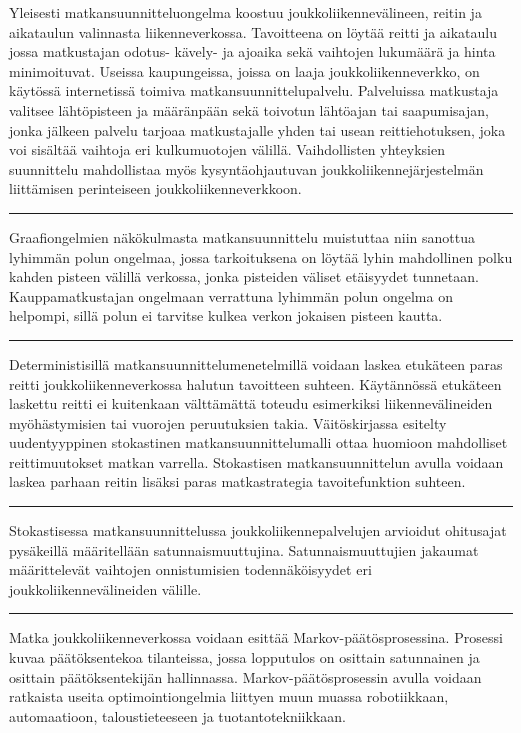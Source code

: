 \documentclass[a4paper,12pt]{article}
\newcommand*\sepline{%
  \begin{center}
    \rule[1ex]{.5\textwidth}{.5pt}
  \end{center}}
\begin{document}
Yleisesti matkansuunnitteluongelma koostuu joukkoliikennevälineen, reitin ja aikataulun valinnasta liikenneverkossa. 
Tavoitteena on löytää reitti ja aikataulu jossa matkustajan
odotus- kävely- ja ajoaika sekä vaihtojen lukumäärä ja hinta minimoituvat. Useissa kaupungeissa, joissa 
on laaja joukkoliikenneverkko, on käytössä internetissä toimiva matkansuunnittelupalvelu. Palveluissa 
matkustaja valitsee lähtöpisteen ja määränpään sekä toivotun lähtöajan tai saapumisajan, jonka jälkeen
palvelu tarjoaa matkustajalle yhden tai usean reittiehotuksen, joka voi sisältää vaihtoja eri kulkumuotojen välillä.
Vaihdollisten yhteyksien suunnittelu mahdollistaa myös kysyntäohjautuvan joukkoliikennejärjestelmän liittämisen
perinteiseen joukkoliikenneverkkoon.

\sepline

Graafiongelmien näkökulmasta matkansuunnittelu muistuttaa niin sanottua lyhimmän polun ongelmaa, jossa
tarkoituksena on löytää lyhin mahdollinen polku kahden pisteen välillä verkossa, jonka pisteiden väliset etäisyydet tunnetaan.
Kauppamatkustajan ongelmaan verrattuna lyhimmän polun ongelma on helpompi, sillä polun ei tarvitse kulkea verkon jokaisen 
pisteen kautta.

\sepline

Deterministisillä matkansuunnittelumenetelmillä voidaan laskea etukäteen paras reitti joukkoliikenneverkossa halutun
tavoitteen suhteen. Käytännössä etukäteen 
laskettu reitti ei kuitenkaan välttämättä toteudu esimerkiksi liikennevälineiden myöhästymisien tai vuorojen peruutuksien takia. 
Väitöskirjassa esitelty uudentyyppinen stokastinen matkansuunnittelumalli ottaa huomioon mahdolliset reittimuutokset 
matkan varrella. 
Stokastisen matkansuunnittelun avulla voidaan laskea parhaan reitin lisäksi paras matkastrategia tavoitefunktion suhteen.

\sepline


Stokastisessa matkansuunnittelussa joukkoliikennepalvelujen arvioidut ohitusajat pysäkeillä määritellään satunnaismuuttujina.
Satunnaismuuttujien jakaumat määrittelevät vaihtojen onnistumisien todennäköisyydet eri joukkoliikennevälineiden välille.

\sepline

Matka joukkoliikenneverkossa voidaan esittää Markov-päätösprosessina. Prosessi kuvaa päätöksentekoa tilanteissa, jossa 
lopputulos on osittain satunnainen ja osittain päätöksentekijän hallinnassa.
Markov-päätösprosessin avulla voidaan ratkaista useita optimointiongelmia liittyen muun muassa robotiikkaan, automaatioon, taloustieteeseen 
ja tuotantotekniikkaan. 
\end{document}
